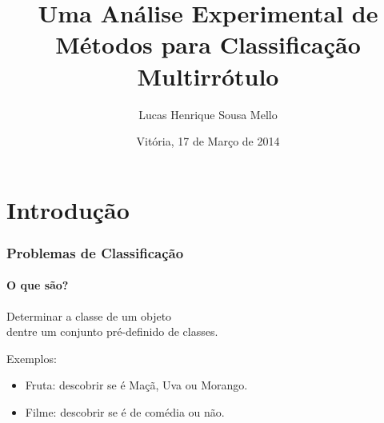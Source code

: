 \documentclass[10pt,fleqn]{beamer}
\title[]{Uma Análise Experimental de Métodos para Classificação Multirrótulo}
\subtitle{}
\author{Lucas Henrique Sousa Mello}
\institute[NINFA]{}
\date[Vitória, 17/03/2014]{Vitória, 17 de Março de 2014}
\newcommand{\litem}[1]{
  \item{#1 \vspace{9pt}}
}
\begin{document}





\begin{frame}
  \titlepage
\end{frame}


\section{Introdução}

\begin{frame}
  \frametitle{Problemas de Classificação}
  \framesubtitle{O que são?}
  \begin{center}
  Determinar a classe de um objeto \\ dentre um conjunto pré-definido de classes. 
  \end{center}

  
  
  \begin{exampleblock}{Exemplos:}
  \begin{itemize}
   \item Fruta: descobrir se é Maçã, Uva ou Morango.
   \item Filme: descobrir se é de comédia ou não.
  \end{itemize}
  
 \end{exampleblock}
\end{frame}
\end{document}

